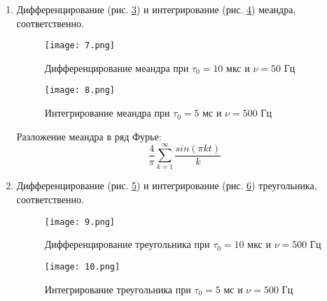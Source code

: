 \documentclass[a4paper]{article}
\begin{document}
\begin{enumerate}
\begin{gather*}
    \end{gather*}
    Удовлетворительное дифференцирование и интегрирование
    урезанной синусоиды показано на рис. \ref{Дифференцирование при 10 мкс и 500 Гц}
    и рис. \ref{Интегрирование при 5 мс и 5000 Гц}, соответственно.
    \begin{figure}[h]
        \centering
        \texttt{[image: 5.png]}
        \caption{Дифференцирование при $\tau_0 = 10$ мкс и $\nu = 500$ Гц}
        \label{Дифференцирование при 10 мкс и 500 Гц}
    \end{figure}
    \begin{figure}[h]
        \centering
        \texttt{[image: 6.png]}
        \caption{Интегрирование при $\tau_0 = 5$ мс и $\nu = 5000$ Гц}
        \label{Интегрирование при 5 мс и 5000 Гц}
    \end{figure}
    \item Дифференцирование (рис. \ref{Дифференцирование меандра при 10 мкс и 50 Гц})
    и интегрирование (рис. \ref{Интегрирование меандра при 5 мс и 500 Гц}) меандра,
    соответственно.
    \begin{figure}[h]
        \centering
        \texttt{[image: 7.png]}
        \caption{Дифференцирование меандра при $\tau_0 = 10$ мкс и $\nu = 50$ Гц}
        \label{Дифференцирование меандра при 10 мкс и 50 Гц}
    \end{figure}
    \begin{figure}[h]
        \centering
        \texttt{[image: 8.png]}
        \caption{Интегрирование меандра при $\tau_0 = 5$ мс и $\nu = 500$ Гц}
        \label{Интегрирование меандра при 5 мс и 500 Гц}
    \end{figure}

    Разложение меандра в ряд Фурье:
    \begin{equation*}
        \dfrac{4}{\pi}\sum\limits_{k=1}^{\infty}\dfrac{sin(\pi  kt)}{k}
    \end{equation*}
    \item Дифференцирование (рис. \ref{Дифференцирование треугольника при 10 мкс и 500 Гц})
    и интегрирование (рис. \ref{Интегрирование треугольника при 5 мс и 500 Гц}) треугольника,
    соответственно.
    \begin{figure}[h]
        \centering
        \texttt{[image: 9.png]}
        \caption{Дифференцирование треугольника при $\tau_0 = 10$ мкс и $\nu = 500$ Гц}
        \label{Дифференцирование треугольника при 10 мкс и 500 Гц}
    \end{figure}
    \begin{figure}[h]
        \centering
        \texttt{[image: 10.png]}
        \caption{Интегрирование треугольника при $\tau_0 = 5$ мс и $\nu = 500$ Гц}
        \label{Интегрирование треугольника при 5 мс и 500 Гц}
    \end{figure}


\end{enumerate}
\end{document}
